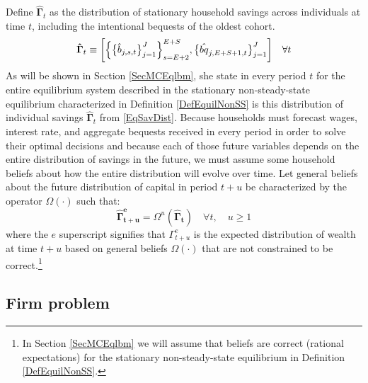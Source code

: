 \documentclass[letterpaper,12pt]{article}
\theoremstyle{definition}
\begin{document}
\begin{spacing}{1.5}
    Define $\bm{\hat{\Gamma}}_t$ as the distribution of stationary household savings across individuals at time $t$, including the intentional bequests of the oldest cohort.
    \begin{equation}\label{EqSavDist}
      \bm{\hat{\Gamma}}_t \equiv \biggl[\Bigl\{\bigl\{\hat{b}_{j,s,t}\bigr\}_{j=1}^J\Bigr\}_{s=E+2}^{E+S},\bigl\{\hat{bq}_{j,E+S+1,t}\bigr\}_{j=1}^J\biggr] \quad\forall t
    \end{equation}
    As will be shown in Section \ref{SecMCEqlbm}, she state in every period $t$ for the entire equilibrium system described in the stationary non-steady-state equilibrium characterized in Definition \ref{DefEquilNonSS} is this distribution of individual savings $\bm{\hat{\Gamma}}_t$ from \eqref{EqSavDist}. Because households must forecast wages, interest rate, and aggregate bequests received in every period in order to solve their optimal decisions and because each of those future variables depends on the entire distribution of savings in the future, we must assume some household beliefs about how the entire distribution will evolve over time. Let general beliefs about the future distribution of capital in period $t+u$ be characterized by the operator $\Omega(\cdot)$ such that:
    \begin{equation}\label{EqBeliefs}
      \bm{\hat{\Gamma}^e_{t+u}} = \Omega^u\left(\bm{\hat{\Gamma}_t}\right) \quad \forall t, \quad u\geq 1
    \end{equation}
    where the $e$ superscript signifies that $\Gamma^e_{t+u}$ is the expected distribution of wealth at time $t+u$ based on general beliefs $\Omega(\cdot)$ that are not constrained to be correct.\footnote{In Section \ref{SecMCEqlbm} we will assume that beliefs are correct (rational expectations) for the stationary non-steady-state equilibrium in Definition \ref{DefEquilNonSS}.}


  \subsection{Firm problem}\label{SecFirms}


\end{spacing}
\end{document}
